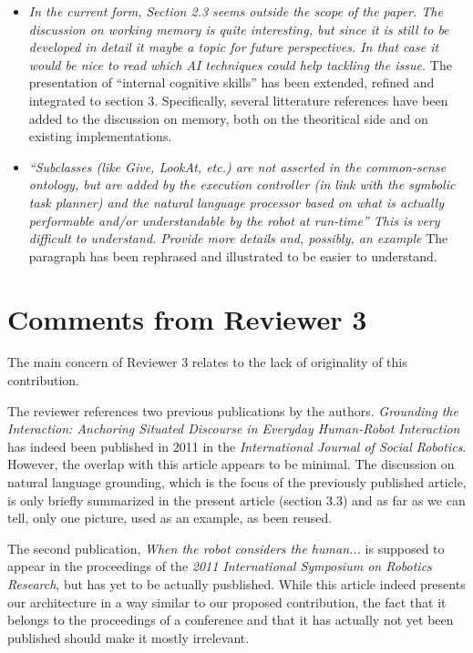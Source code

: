 \documentclass{article}
\begin{document}
\begin{itemize}
    \item \emph{In the current form, Section 2.3 seems outside the scope of the
            paper. The discussion on working memory is quite interesting, but
            since it is still to be developed in detail it maybe a topic for
            future perspectives. In that case it would be nice to read which AI
            techniques could help tackling the issue.} The presentation of
            ``internal cognitive skills'' has been extended, refined and integrated
            to section 3. Specifically, several litterature references have been
            added to the discussion on memory, both on the theoritical side and on
            existing implementations.

    \item \emph{``Subclasses (like Give, LookAt, etc.) are not asserted in the
            common-sense ontology, but are added by the execution controller (in
            link with the symbolic task planner) and the natural language
            processor based on what is actually performable and/or
            understandable by the robot at run-time'' This is very difficult to
            understand. Provide more details and, possibly, an example} The paragraph
            has been rephrased and illustrated to be easier to understand.

\end{itemize}

\section{Comments from Reviewer 3}

The main concern of Reviewer 3 relates to the lack of originality of this
contribution.

The reviewer references two previous publications by the authors. \emph{Grounding
the Interaction: Anchoring Situated Discourse in Everyday Human-Robot
Interaction} has indeed been published in 2011 in the \emph{International Journal of
Social Robotics}. However, the overlap with this article appears to be minimal. The
discussion on natural language grounding, which is the focus of the previously
published article, is only briefly summarized in the present article (section
3.3) and as far as we can tell, only one picture, used as an example, as been
reused.

The second publication, \emph{When the robot considers the human...} is supposed
to appear in the proceedings of the \emph{2011 International Symposium on
Robotics Research}, but has yet to be actually pusblished.  While this article
indeed presents our architecture in a way similar to our proposed contribution,
the fact that it belongs to the proceedings of a conference and that it has
actually not yet been published should make it mostly irrelevant.
\end{document}
